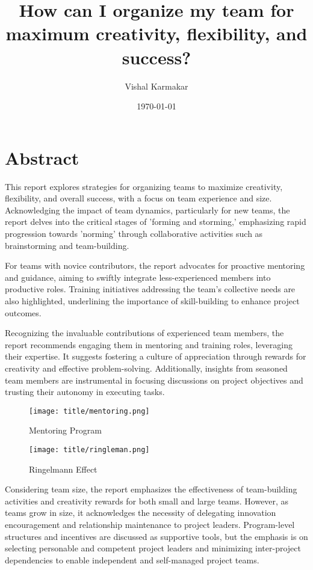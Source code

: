 \documentclass[a4paper, twoside]{article}
\date{\monthyeardate\today}
\author{Vishal  Karmakar}
\title{How can I organize my team
for maximum creativity, flexibility,
and success?}
\begin{document}

\tableofcontents
\newpage
\section{Abstract}
This report explores strategies for organizing teams to maximize creativity, flexibility, and overall success, with a focus on team experience and size. Acknowledging the impact of team dynamics, particularly for new teams, the report delves into the critical stages of 'forming and storming,' emphasizing rapid progression towards 'norming' through collaborative activities such as brainstorming and team-building.

For teams with novice contributors, the report advocates for proactive mentoring and guidance, aiming to swiftly integrate less-experienced members into productive roles. Training initiatives addressing the team's collective needs are also highlighted, underlining the importance of skill-building to enhance project outcomes.

Recognizing the invaluable contributions of experienced team members, the report recommends engaging them in mentoring and training roles, leveraging their expertise. It suggests fostering a culture of appreciation through rewards for creativity and effective problem-solving. Additionally, insights from seasoned team members are instrumental in focusing discussions on project objectives and trusting their autonomy in executing tasks.



\begin{figure}[h]
\centering
\begin{minipage}{.5\textwidth}
  \centering
  \texttt{[image: title/mentoring.png]}
  \caption{Mentoring Program}
  \label{fig:test1}
\end{minipage}%
\begin{minipage}{.5\textwidth}
  \centering
  \texttt{[image: title/ringleman.png]}
  \caption{Ringelmann Effect}
  \label{fig:test2}
\end{minipage}
\end{figure}

Considering team size, the report emphasizes the effectiveness of team-building activities and creativity rewards for both small and large teams. However, as teams grow in size, it acknowledges the necessity of delegating innovation encouragement and relationship maintenance to project leaders. Program-level structures and incentives are discussed as supportive tools, but the emphasis is on selecting personable and competent project leaders and minimizing inter-project dependencies to enable independent and self-managed project teams.
\end{document}
